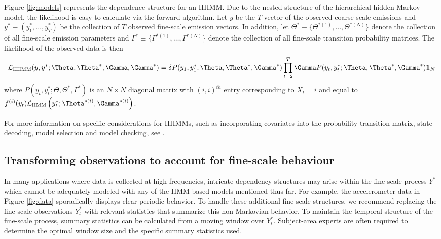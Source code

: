 Figure \ref{fig:models} represents the dependence structure for an HHMM. Due to the nested structure of the hierarchical hidden Markov model, the likelihood is easy to calculate via the forward algorithm.
%
Let $y$ be the $T$-vector of the observed coarse-scale emissions and
$y^* \equiv \left(y^*_1, \ldots,y^*_T\right)$ be the collection of $T$ observed fine-scale emission vectors.
%
In addition, let $\Theta^* \equiv \{\Theta^{*(1)}, \ldots, \Theta^{*(N)}\}$ denote the collection of all fine-scale emission parameters and $\Gamma^* \equiv \{\Gamma^{*(1)}, \ldots, \Gamma^{*(N)}\}$ denote the collection of all fine-scale transition probability matrices. The likelihood of the observed data is then
%
\[
\calL_{\text{HHMM}}(y,y^*;\Theta,\Theta^*,\Gamma,\Gamma^*) = \delta P(y_1,y_1^*;\Theta,\Theta^*,\Gamma^*) \prod_{t=2}^T \Gamma P(y_t,y_t^*;\Theta,\Theta^*,\Gamma^*) \mathbf{1}_N
\]
%
where $P(y_t,y_t^*;\Theta,\Theta^*,\Gamma^*)$ is an $N \times N$ diagonal matrix with $(i,i)^{th}$ entry corresponding to $X_t=i$ and equal to 
$f^{(i)}(y_t)\calL_{\text{HMM}}\left(y_t^*;\Theta^{*(i)},
\Gamma^{*(i)}\right)$. 

For more information on specific considerations for HHMMs, such as incorporating covariates into the probability transition matrix, state decoding, model selection and model checking, see \citet{Adam:2019}. 

\subsection{Transforming observations to account for fine-scale behaviour}
\label{subsec:STFT}

In many applications where data is collected at high frequencies, intricate dependency structures may arise within the fine-scale process $Y^*$ which cannot be adequately modeled with any of the HMM-based models mentioned thus far. For example, the accelerometer data in Figure \ref{fig:data} sporadically displays clear periodic behavior. To handle these additional fine-scale structures, we recommend replacing the fine-scale observations $Y_t^*$ with relevant statistics that summarize this non-Markovian behavior. To maintain the temporal structure of the fine-scale process, summary statistics can be calculated from a moving window over $Y_t^*$. Subject-area experts are often required to determine the optimal window size and the specific summary statistics used. 
%
%

